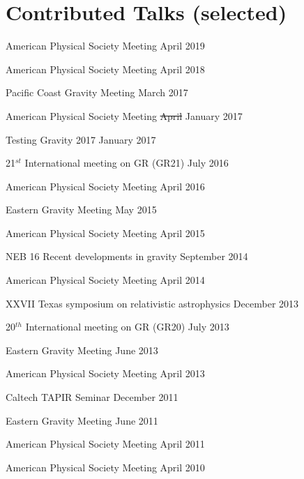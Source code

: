 \section{\sc Contributed Talks (selected)}
\begin{etaremune}
\item
  American Physical Society Meeting
  \hfill{}
  April 2019
\item
  American Physical Society Meeting
  \hfill{}
  April 2018
\item
  Pacific Coast Gravity Meeting
  \hfill{}
  March 2017
\item
  American Physical Society Meeting
  \hfill{}
  \sout{April} January 2017
\item
  Testing Gravity 2017
  \hfill{}
  January 2017
\item
  21$^{st}$ International meeting on GR (GR21)
  \hfill{}
  July 2016
\item
  American Physical Society Meeting
  \hfill{}
  April 2016
\item
  Eastern Gravity Meeting
  \hfill{}
  May 2015
\item
  American Physical Society Meeting
  \hfill{}
  April 2015
\item
  NEB 16 Recent developments in gravity
  \hfill{}
  September 2014
\item
  American Physical Society Meeting
  \hfill{}
  April 2014
\item
  XXVII Texas symposium on relativistic astrophysics
  \hfill{}
  December 2013
\item
  20$^{th}$ International meeting on GR (GR20)
  \hfill{}
  July 2013
\item
  Eastern Gravity Meeting
  \hfill{}
  June 2013
\item
  American Physical Society Meeting
  \hfill{}
  April 2013
\item
  Caltech TAPIR Seminar
  \hfill{}
  December 2011
\item
  Eastern Gravity Meeting
  \hfill{}
  June 2011
\item
  American Physical Society Meeting
  \hfill{}
  April 2011
\item
  American Physical Society Meeting
  \hfill{}
  April 2010
\end{etaremune}


